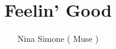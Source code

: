 \documentclass[a4paper, 10 pt]{article}
\title{Feelin' Good}
\author{Nina Simone ( Muse ) }
\date{}
\begin{document}
    {
        \Fontskrivan\bfseries\slshape
        \fontsize{10pt}{50pt}\selectfont
        \color{blue}
        \maketitle

    }



    \begin{Row}
        \begin{Cell}{1}

           
        \end{Cell}
        \begin{Cell}{1}
        \end{Cell}
    \end{Row}\\
\end{document}
